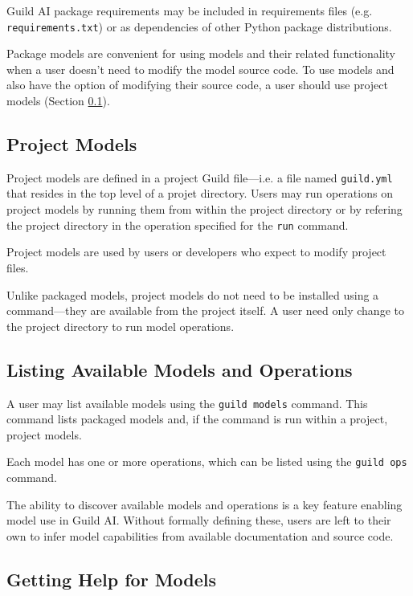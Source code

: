\documentclass{article}
\begin{document}
Guild AI package requirements may be included in requirements files
(e.g. \verb|requirements.txt|) or as dependencies of other Python
package distributions.

Package models are convenient for using models and their related
functionality when a user doesn't need to modify the model source
code. To use models and also have the option of modifying their source
code, a user should use project models (Section
\ref{sec:project-models}).

\subsection{Project Models}
\label{sec:project-models}

Project models are defined in a project Guild file---i.e. a file named
\verb|guild.yml| that resides in the top level of a projet
directory. Users may run operations on project models by running them
from within the project directory or by refering the project directory
in the operation specified for the \verb|run| command.

Project models are used by users or developers who expect to modify
project files.

Unlike packaged models, project models do not need to be installed
using a command---they are available from the project itself. A user
need only change to the project directory to run model operations.

\subsection{Listing Available Models and Operations}

A user may list available models using the \verb|guild models|
command. This command lists packaged models and, if the command is run
within a project, project models.

Each model has one or more operations, which can be listed using the
\verb|guild ops| command.

The ability to discover available models and operations is a key
feature enabling model use in Guild AI. Without formally defining
these, users are left to their own to infer model capabilities from
available documentation and source code.

\subsection{Getting Help for Models}
\end{document}

